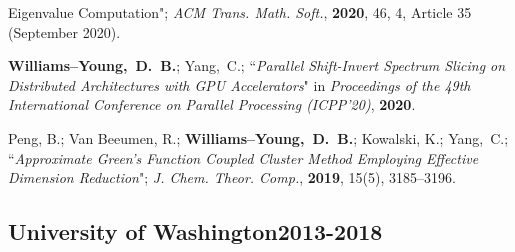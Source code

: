 \documentclass[10pt]{res} %
\newcommand*\me[0]{{\bf Williams--Young,~D.~B.}}
\newcommand*\cy[0]{Yang,~C.}
\begin{document}
\begin{resume}
\begin{etaremune}
{        Eigenvalue Computation}";
        \emph{ACM Trans. Math. Soft.}, \textbf{2020}, 46, 4, Article 35 (September 2020).
  \item \me; \cy;
        ``\emph{Parallel Shift-Invert Spectrum Slicing on Distributed Architectures with GPU Accelerators}"
        in \emph{Proceedings of the 49th International Conference on Parallel Processing (ICPP'20)}, \textbf{2020}.
  \item Peng, B.; Van Beeumen, R.; \me; Kowalski, K.; \cy;
        ``\emph{Approximate Green’s Function Coupled Cluster Method Employing 
          Effective Dimension Reduction}";
        \emph{J. Chem. Theor. Comp.}, \textbf{2019}, 15(5), 3185--3196.
\end{etaremune}

\subsection{University of Washington\hfill 2013-2018}


\end{resume}
\end{document}
